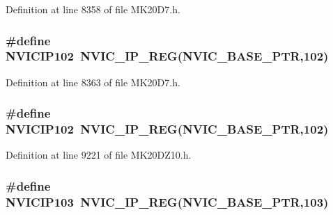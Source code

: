 Definition at line 8358 of file M\+K20\+D7.\+h.

\subsubsection[{\texorpdfstring{N\+V\+I\+C\+I\+P102}{NVICIP102}}]{\setlength{\rightskip}{0pt plus 5cm}\#define N\+V\+I\+C\+I\+P102~{\bf N\+V\+I\+C\+\_\+\+I\+P\+\_\+\+R\+EG}({\bf N\+V\+I\+C\+\_\+\+B\+A\+S\+E\+\_\+\+P\+TR},102)}\hypertarget{group___n_v_i_c___register___accessor___macros_gad311dfb6dc903f34f59d2be357d1e4fa}{}\label{group___n_v_i_c___register___accessor___macros_gad311dfb6dc903f34f59d2be357d1e4fa}


Definition at line 8363 of file M\+K20\+D7.\+h.

\subsubsection[{\texorpdfstring{N\+V\+I\+C\+I\+P102}{NVICIP102}}]{\setlength{\rightskip}{0pt plus 5cm}\#define N\+V\+I\+C\+I\+P102~{\bf N\+V\+I\+C\+\_\+\+I\+P\+\_\+\+R\+EG}({\bf N\+V\+I\+C\+\_\+\+B\+A\+S\+E\+\_\+\+P\+TR},102)}\hypertarget{group___n_v_i_c___register___accessor___macros_gad311dfb6dc903f34f59d2be357d1e4fa}{}\label{group___n_v_i_c___register___accessor___macros_gad311dfb6dc903f34f59d2be357d1e4fa}


Definition at line 9221 of file M\+K20\+D\+Z10.\+h.

\subsubsection[{\texorpdfstring{N\+V\+I\+C\+I\+P103}{NVICIP103}}]{\setlength{\rightskip}{0pt plus 5cm}\#define N\+V\+I\+C\+I\+P103~{\bf N\+V\+I\+C\+\_\+\+I\+P\+\_\+\+R\+EG}({\bf N\+V\+I\+C\+\_\+\+B\+A\+S\+E\+\_\+\+P\+TR},103)}\hypertarget{group___n_v_i_c___register___accessor___macros_gaf71224e0d8d61e8b017aadc3b24fd7d6}{}\label{group___n_v_i_c___register___accessor___macros_gaf71224e0d8d61e8b017aadc3b24fd7d6}


